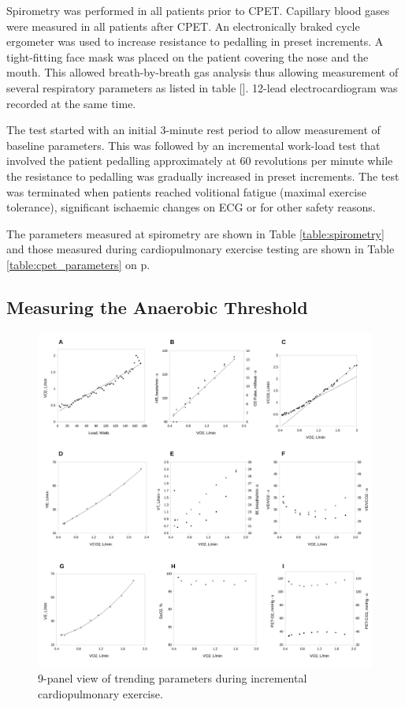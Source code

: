 Spirometry was performed in all patients prior to CPET. 
Capillary blood gases were measured in all patients after CPET. 
An electronically braked cycle ergometer was used to increase resistance to pedalling in preset increments. 
A tight-fitting face mask was placed on the patient covering the nose and the mouth. 
This allowed breath-by-breath gas analysis thus allowing measurement of several respiratory parameters as listed in table []. 12-lead electrocardiogram was recorded at the same time. 

The test started with an initial 3-minute rest period to allow measurement of baseline parameters. 
This was followed by an incremental work-load test that involved the patient pedalling approximately at 60 revolutions per minute while the resistance to pedalling was gradually increased in preset increments. 
The test was terminated when patients reached volitional fatigue (maximal exercise tolerance), significant ischaemic changes on ECG or for other safety reasons. 

The parameters measured at spirometry are shown in Table \ref{table:spirometry} and those measured during cardiopulmonary exercise testing are shown in Table \ref{table:cpet_parameters} on p\pageref{table:cpet_parameters}.

\subsection{Measuring the Anaerobic Threshold}

\begin{figure}[htbp]
	\centering
	\includegraphics[width=\textwidth]{Figures/cpet_9panel.pdf}
	\caption{9-panel view of trending parameters during incremental cardiopulmonary exercise.}
	\label{fig:cpet_9panel}
\end{figure}

